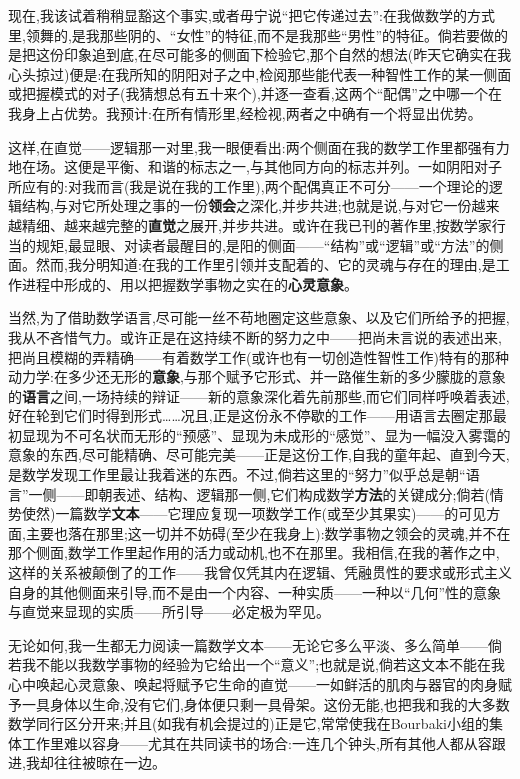 现在,我该试着稍稍显豁这个事实,或者毋宁说“把它传递过去”:在我做数学的方式里,领舞的,是我那些阴的、“女性”的特征,而不是我那些“男性”的特征。倘若要做的是把这份印象追到底,在尽可能多的侧面下检验它,那个自然的想法(昨天它确实在我心头掠过)便是:在我所知的阴阳对子之中,检阅那些能代表一种智性工作的某一侧面或把握模式的对子(我猜想总有五十来个),并逐一查看,这两个“配偶”之中哪一个在我身上占优势。我预计:在所有情形里,经检视,两者之中确有一个将显出优势。

这样,在直觉——逻辑那一对里,我一眼便看出:两个侧面在我的数学工作里都强有力地在场。这便是平衡、和谐的标志之一,与其他同方向的标志并列。一如阴阳对子所应有的:对我而言(我是说在我的工作里),两个配偶真正不可分——一个理论的逻辑结构,与对它所处理之事的一份\textbf{领会}之深化,并步共进;也就是说,与对它一份越来越精细、越来越完整的\textbf{直觉}之展开,并步共进。或许在我已刊的著作里,按数学家行当的规矩,最显眼、对读者最醒目的,是阳的侧面——“结构”或“逻辑”或“方法”的侧面。然而,我分明知道:在我的工作里引领并支配着的、它的灵魂与存在的理由,是工作进程中形成的、用以把握数学事物之实在的\textbf{心灵意象}。

当然,为了借助数学语言,尽可能一丝不苟地圈定这些意象、以及它们所给予的把握,我从不吝惜气力\dmark{}。或许正是在这持续不断的努力之中——把尚未言说的表述出来,把尚且模糊的弄精确——有着数学工作(或许也有一切创造性智性工作)特有的那种动力学:在多少还无形的\textbf{意象},与那个赋予它形式、并一路催生新的多少朦胧的意象的\textbf{语言}之间,一场持续的辩证——新的意象深化着先前那些,而它们同样呼唤着表述,好在轮到它们时得到形式……况且,正是这份永不停歇的工作——用语言去圈定那最初显现为不可名状而无形的“预感”、显现为未成形的“感觉”、显为一幅没入雾霭的意象的东西,尽可能精确、尽可能完美——正是这份工作,自我的童年起、直到今天,是数学发现工作里最让我着迷的东西。不过,倘若这里的“努力”似乎总是朝“语言”一侧——即朝表述、结构、逻辑那一侧,它们构成数学\textbf{方法}的关键成分;倘若(情势使然)一篇数学\textbf{文本}——它理应复现一项数学工作(或至少其果实)——的可见方面,主要也落在那里;这一切并不妨碍(至少在我身上):数学事物之领会的灵魂,并不在那个侧面,数学工作里起作用的活力或动机,也不在那里。我相信,在我的著作之中,这样的关系被颠倒了的工作——我曾仅凭其内在逻辑、凭融贯性的要求或形式主义自身的其他侧面来引导,而不是由一个内容、一种实质——一种以“几何”性的意象与直觉来显现的实质——所引导——必定极为罕见。

无论如何,我一生都无力阅读一篇数学文本——无论它多么平淡、多么简单——倘若我不能以我数学事物的经验为它给出一个“意义”;也就是说,倘若这文本不能在我心中唤起心灵意象、唤起将赋予它生命的直觉——一如鲜活的肌肉与器官的肉身赋予一具身体以生命,没有它们,身体便只剩一具骨架。这份无能,也把我和我的大多数数学同行区分开来;并且(如我有机会提过的)正是它,常常使我在Bourbaki小组的集体工作里难以容身——尤其在共同读书的场合:一连几个钟头,所有其他人都从容跟进,我却往往被晾在一边。


